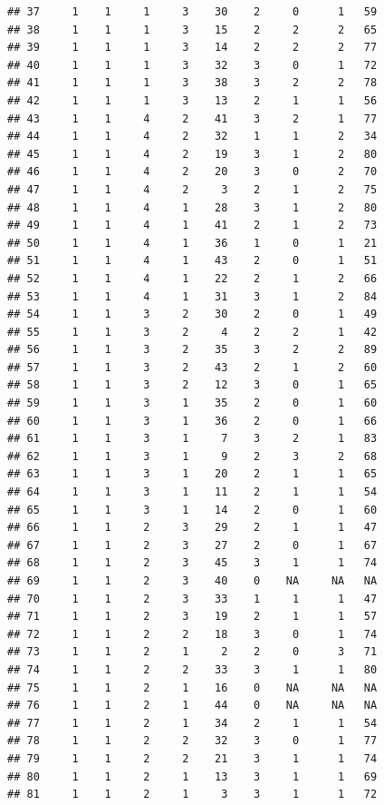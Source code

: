 \documentclass[krantz2]{krantz}\usepackage{knitr}%
\begin{document}
\begin{knitrout}
\begin{kframe}
\begin{verbatim}
## 37     1    1     1     3    30    2     0      1   59
## 38     1    1     1     3    15    2     2      2   65
## 39     1    1     1     3    14    2     2      2   77
## 40     1    1     1     3    32    3     0      1   72
## 41     1    1     1     3    38    3     2      2   78
## 42     1    1     1     3    13    2     1      1   56
## 43     1    1     4     2    41    3     2      1   77
## 44     1    1     4     2    32    1     1      2   34
## 45     1    1     4     2    19    3     1      2   80
## 46     1    1     4     2    20    3     0      2   70
## 47     1    1     4     2     3    2     1      2   75
## 48     1    1     4     1    28    3     1      2   80
## 49     1    1     4     1    41    2     1      2   73
## 50     1    1     4     1    36    1     0      1   21
## 51     1    1     4     1    43    2     0      1   51
## 52     1    1     4     1    22    2     1      2   66
## 53     1    1     4     1    31    3     1      2   84
## 54     1    1     3     2    30    2     0      1   49
## 55     1    1     3     2     4    2     2      1   42
## 56     1    1     3     2    35    3     2      2   89
## 57     1    1     3     2    43    2     1      2   60
## 58     1    1     3     2    12    3     0      1   65
## 59     1    1     3     1    35    2     0      1   60
## 60     1    1     3     1    36    2     0      1   66
## 61     1    1     3     1     7    3     2      1   83
## 62     1    1     3     1     9    2     3      2   68
## 63     1    1     3     1    20    2     1      1   65
## 64     1    1     3     1    11    2     1      1   54
## 65     1    1     3     1    14    2     0      1   60
## 66     1    1     2     3    29    2     1      1   47
## 67     1    1     2     3    27    2     0      1   67
## 68     1    1     2     3    45    3     1      1   74
## 69     1    1     2     3    40    0    NA     NA   NA
## 70     1    1     2     3    33    1     1      1   47
## 71     1    1     2     3    19    2     1      1   57
## 72     1    1     2     2    18    3     0      1   74
## 73     1    1     2     1     2    2     0      3   71
## 74     1    1     2     2    33    3     1      1   80
## 75     1    1     2     1    16    0    NA     NA   NA
## 76     1    1     2     1    44    0    NA     NA   NA
## 77     1    1     2     1    34    2     1      1   54
## 78     1    1     2     2    32    3     0      1   77
## 79     1    1     2     2    21    3     1      1   74
## 80     1    1     2     1    13    3     1      1   69
## 81     1    1     2     1     3    3     1      1   72

\end{verbatim}
\end{kframe}
\end{knitrout}
\end{document}
